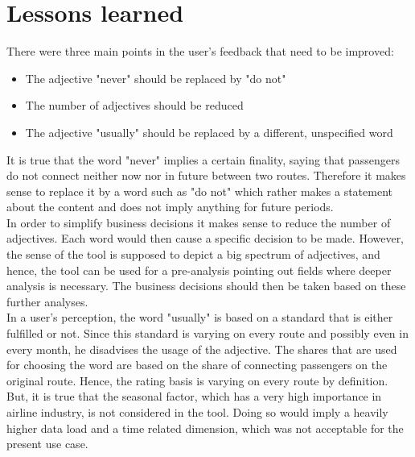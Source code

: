 \documentclass[conference]{IEEEtran}
\begin{document}
\section{Lessons learned}
There were three main points in the user's feedback that need to be improved:
\begin{itemize}
\item The adjective "never" should be replaced by "do not"
\item The number of adjectives should be reduced
\item The adjective "usually" should be replaced by a different, unspecified word
\end{itemize}
It is true that the word "never" implies a certain finality, saying that passengers do not connect neither now nor in future between two routes. Therefore it makes sense to replace it by a word such as "do not" which rather makes a statement about the content and does not imply anything for future periods.\\
In order to simplify business decisions it makes sense to reduce the number of adjectives. Each word would then cause a specific decision to be made. However, the sense of the tool is supposed to depict a big spectrum of adjectives, and hence, the tool can be used for a pre-analysis pointing out fields where deeper analysis is necessary. The business decisions should then be taken based on these further analyses.\\
In a user's perception, the word "usually" is based on a standard that is either fulfilled or not. Since this standard is varying on every route and possibly even in every month, he disadvises the usage of the adjective. The shares that are used for choosing the word are based on the share of connecting passengers on the original route. Hence, the rating basis is varying on every route by definition. But, it is true that the seasonal factor, which has a very high importance in airline industry, is not considered in the tool. Doing so would imply a heavily higher data load and a time related dimension, which was not acceptable for the present use case.
\end{document}
